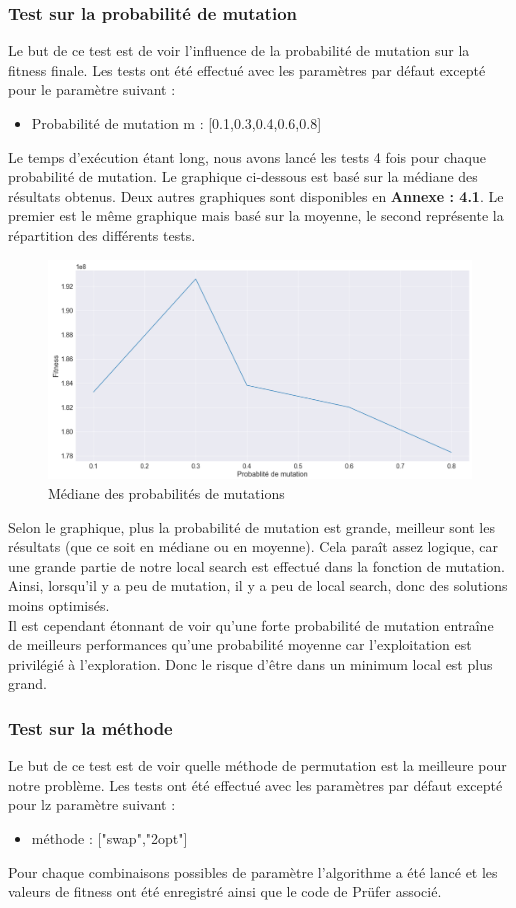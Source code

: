 \documentclass{article} %
\begin{document}
\subsubsection{Test sur la probabilité de mutation}
Le but de ce test est de voir l'influence de la probabilité de mutation sur la fitness finale. Les tests ont été effectué avec les paramètres par défaut excepté pour le paramètre suivant :
\begin{itemize}
	\item Probabilité de mutation m : [0.1,0.3,0.4,0.6,0.8]
\end{itemize}
Le temps d'exécution étant long, nous avons lancé les tests 4 fois pour chaque probabilité de mutation. Le graphique ci-dessous est basé sur la médiane des résultats obtenus. Deux autres graphiques sont disponibles en \textbf{Annexe : 4.1}. Le premier est le même graphique mais basé sur la moyenne, le second représente la répartition des différents tests.
\begin{figure}[!h]
	\centering
	\includegraphics[keepaspectratio = true,scale=0.65]{mutationProb.png}
	\caption{Médiane des probabilités de mutations}
\end{figure}
Selon le graphique, plus la probabilité de mutation est grande, meilleur sont les résultats (que ce soit en médiane ou en moyenne). Cela paraît assez logique, car une grande partie de notre local search est effectué dans la fonction de mutation. Ainsi, lorsqu'il y a peu de mutation, il y a peu de local search, donc des solutions moins optimisés.\\
Il est cependant étonnant de voir qu'une forte probabilité de mutation entraîne de meilleurs performances qu'une probabilité moyenne car l'exploitation est privilégié à l'exploration. Donc le risque d'être dans un minimum local est plus grand.\\

\subsubsection{Test sur la méthode}
Le but de ce test est de voir quelle méthode de permutation est la meilleure pour notre problème. Les tests ont été effectué avec les paramètres par défaut excepté pour lz paramètre suivant :
\begin{itemize}
	\item méthode : ["swap","2opt"]
\end{itemize}
Pour chaque combinaisons possibles de paramètre l'algorithme a été lancé et les valeurs de fitness ont été enregistré ainsi que le code de Prüfer associé.
\newpage
\end{document}
